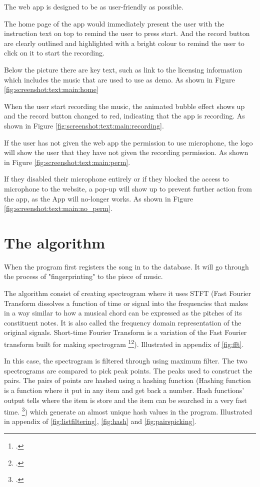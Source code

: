 The web app is designed to be as user-friendly as possible. 

The home page of the app would immediately present the user with the instruction text on top to remind the user to press start. And the record button are clearly outlined and highlighted with a bright colour to remind the user to click on it to start the recording. 

Below the picture there are key text, such as link to the licensing information which includes the music that are used to use as demo. As shown in Figure \autoref{fig:screenshot:text:main:home}

When the user start recording the music, the animated bubble effect shows up and the record button changed to red, indicating that the app is recording. As shown in Figure \autoref{fig:screenshot:text:main:recording}.

If the user has not given the web app the permission to use microphone, the logo will show the user that they have not given the recording permission. As shown in Figure \autoref{fig:screenshot:text:main:perm}.

If they disabled their microphone entirely or if they blocked the access to microphone to the website, a pop-up will show up to prevent further action from the app, as the App will no-longer works. As shown in Figure \autoref{fig:screenshot:text:main:no_perm}.

\section{The algorithm}
When the program first registers the song in to the database. It will go through the process of "fingerprinting" to the piece of music. 

The algorithm consist of creating spectrogram where it uses STFT (Fast Fourier Transform dissolves a function of time or signal into the frequencies that makes in a way similar to how a musical chord can be expressed as the pitches of its constituent notes. It is also called the frequency domain representation of the original signals. Short-time Fourier Transform is a variation of the Fast Fourier transform built for making spectrogram \footcite{alpay_short-time_2024}\footcite{chittora_brief_2018}). Illustrated in appendix of \autoref{fig:fft}.  

In this case, the spectrogram is filtered through using maximum filter. The two spectrograms are compared to pick peak points. The peaks used to construct the pairs. The pairs of points are hashed using a hashing function (Hashing function is a function where it put in any item and get back a number. Hash functions' output tells where the item is store and the item can be searched in a very fast time. \footcite{bhargava_grokking_2016}) which generate an almost unique hash values in the program.  Illustrated in appendix of \autoref{fig:listfiltering}, \autoref{fig:hash} and \autoref{fig:pairspicking}.

